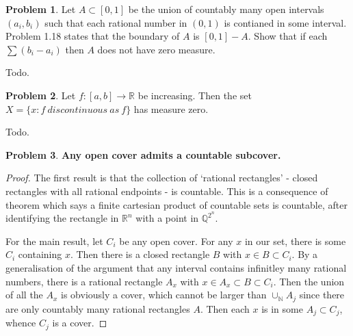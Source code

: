 \documentclass[20pt]{article}
\theoremstyle{plain}
\theoremstyle{definition}
\newtheorem*{problem}{Problem}
\newcommand{\reals}{\mathbb{R}}
\newcommand{\rationals}{\mathbb{Q}}
\newcommand{\naturals}{\mathbb{N}}
\begin{document}
\begin{problem}{3.11}
  Let $A \subset [0, 1]$ be the union of countably many open intervals $(a_i, b_i)$
  such that each rational number in $(0, 1)$ is contianed in  some interval.
  Problem 1.18 states that the boundary of $A$ is  $[0, 1] - A$.
  Show that if each $\sum (b_i - a_i)$ then $A$ does not have zero measure.
\end{problem}
\color{Blue}
Todo.
\color{Black}


\begin{problem}{3.12}
  Let $f: [a, b] \to \reals$ be increasing. Then the set
  $X = \{ x: f\ discontinuous\ as\ f \}$ has measure zero.
\end{problem}
\color{Blue}
Todo.
\color{Black}


\begin{problem}{3.13}
	\textbf{Any open cover admits a countable subcover.}
\end{problem}

\begin{proof}
  The first result is that the collection of `rational rectangles' - closed rectangles
  with all rational endpoints - is countable. This is a consequence of theorem which says
  a finite cartesian product of countable sets is countable, after identifying the rectangle
  in $\reals^n$ with a point in $\rationals^{2^n}$.

  For the main result, let $C_i$ be any open cover. For any $x$ in our set,
  there is some $C_i$ containing $x$.  Then there is a closed rectangle $B$ with
  $x \in B \subset C_i$.  By a generalisation of the argument that any interval contains
  infinitley many rational numbers, there is a rational rectangle $A_x$ with
  $x \in A_x \subset B \subset C_i.$
  Then the union of all the $A_x$ is obviously a cover, which cannot be larger than $\cup_\naturals A_j$ since there are only countably many rational rectangles $A$.
  Then each $x$ is in some $A_j \subset C_j$, whence $C_j$ is a cover.
\end{proof}
\end{document}
